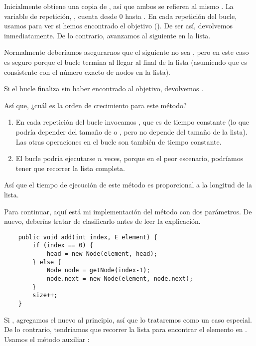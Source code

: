 \documentclass[12pt]{book}
\theoremstyle{exercise}
\begin{document}
Inicialmente  obtiene una copia de , así que ambos se
refieren al mismo . La variable de repetición, , cuenta desde 0 hasta
.  En cada repetición del bucle, usamos  para
ver si hemos encontrado el objetivo (). De ser así, devolvemos  inmediatamente.
De lo contrario, avanzamos al siguiente  en la lista.

Normalmente deberíamos asegurarnos que el siguiente  no sea
, pero en este caso es seguro porque el bucle termina al llegar al
final de la lista (asumiendo que  es consistente con el número exacto de nodos en la lista).

Si el bucle finaliza sin haber encontrado al objetivo, devolvemos
.


Así que, ¿cuál es la orden de crecimiento para este método?

\begin{enumerate}

\item
  En cada repetición del bucle invocamos , que es de
  tiempo constante (lo que podría depender del tamaño de  o
  , pero no depende del tamaño de la lista). Las
  otras operaciones en el bucle son también de tiempo constante.

\item
  El bucle podría ejecutarse $n$ veces, porque en el peor escenario,
  podríamos tener que recorrer la lista completa.

\end{enumerate}

Así que el tiempo de ejecución de este método es proporcional a la longitud
de la lista.


Para continuar, aquí está mi implementación del método 
con dos parámetros. De nuevo, deberías tratar de clasificarlo antes de
leer la explicación.

\begin{verbatim}
    public void add(int index, E element) {
        if (index == 0) {
            head = new Node(element, head);
        } else {
            Node node = getNode(index-1);
            node.next = new Node(element, node.next);
        }
        size++;
    }
\end{verbatim}

Si , agregamos el nuevo  al principio,
así que lo trataremos como un caso especial. De lo contrario, tendríamos
que recorrer la lista para encontrar el elemento en . Usamos el
método auxiliar :
\end{document}

